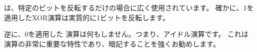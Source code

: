 ﻿\XOR は、特定のビットを反転するだけの場合に広く使用されています。
確かに、1を適用したXOR演算は実質的に1ビットを反転します。



逆に、0を適用した \XOR 演算は何もしません。つまり、アイドル演算です。
これは \XOR 演算の非常に重要な特性であり、暗記することを強くお勧めします。
